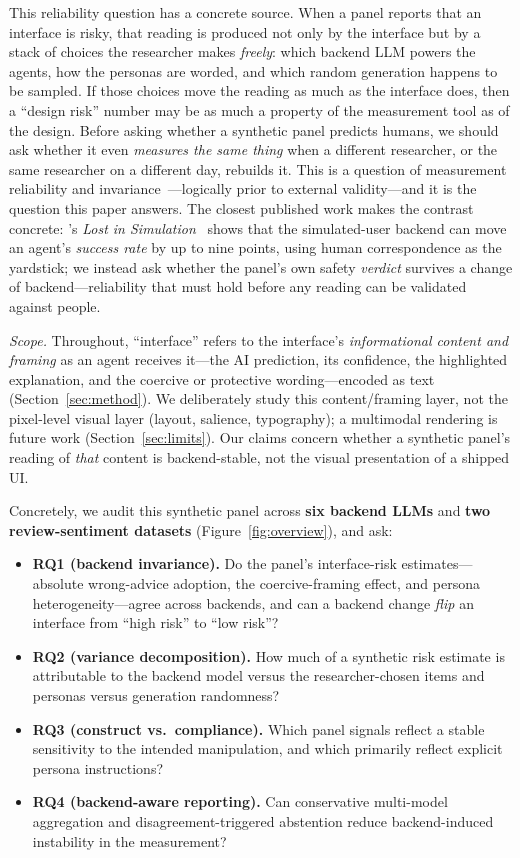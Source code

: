 \documentclass[manuscript,review,anonymous]{acmart}
\begin{document}
This reliability question has a concrete source. When a panel reports that an interface is risky, that reading
is produced not only by the interface but by a stack of choices the researcher makes \emph{freely}: which
backend LLM powers the agents, how the personas are worded, and which random generation happens to be
sampled. If those choices move the reading as much as the interface does, then a ``design risk'' number may
be as much a property of the measurement tool as of the design. Before asking whether a synthetic panel
predicts humans, we should ask whether it even \emph{measures the same thing} when a different researcher,
or the same researcher on a different day, rebuilds it. This is a question of measurement
reliability and invariance~\cite{santurkar2023whose,cheng2023compost}---logically prior to external
validity---and it is the question this paper answers. The closest published work makes the contrast
concrete: \citeauthor{seshadri2026lost}'s \emph{Lost in Simulation}~\cite{seshadri2026lost} shows that the
simulated-user backend can move an agent's \emph{success rate} by up to nine points, using human
correspondence as the yardstick; we instead ask whether the panel's own safety \emph{verdict} survives a
change of backend---reliability that must hold before any reading can be validated against people.

\emph{Scope.} Throughout, ``interface'' refers to the interface's \emph{informational content and framing}
as an agent receives it---the AI prediction, its confidence, the highlighted explanation, and the coercive
or protective wording---encoded as text (Section~\ref{sec:method}). We deliberately study this
content/framing layer, not the pixel-level visual layer (layout, salience, typography); a multimodal
rendering is future work (Section~\ref{sec:limits}). Our claims concern whether a synthetic panel's reading
of \emph{that} content is backend-stable, not the visual presentation of a shipped UI.

Concretely, we audit this synthetic panel across \textbf{six backend LLMs} and \textbf{two
review-sentiment datasets} (Figure~\ref{fig:overview}), and ask:
\begin{itemize}
  \item \textbf{RQ1 (backend invariance).} Do the panel's interface-risk estimates---absolute wrong-advice
  adoption, the coercive-framing effect, and persona heterogeneity---agree across backends, and can a
  backend change \emph{flip} an interface from ``high risk'' to ``low risk''?
  \item \textbf{RQ2 (variance decomposition).} How much of a synthetic risk estimate is attributable to the
  backend model versus the researcher-chosen items and personas versus generation randomness?
  \item \textbf{RQ3 (construct vs.\ compliance).} Which panel signals reflect a stable sensitivity to the
  intended manipulation, and which primarily reflect explicit persona instructions?
  \item \textbf{RQ4 (backend-aware reporting).} Can conservative multi-model aggregation and
  disagreement-triggered abstention reduce backend-induced instability in the measurement?
\end{itemize}
\end{document}
